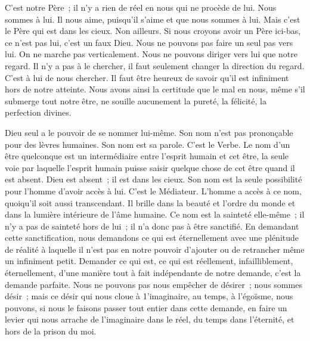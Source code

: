 \documentclass[french,twoside]{book} %
\newenvironment{quoteblock}%
  {\begin{quoting}}
  {\end{quoting}}
\newenvironment{quotebar}{%
    \def\FrameCommand{{\color{rubric!10!}\vrule width 0.5em} \hspace{0.9em}}%
    \def\OuterFrameSep{\itemsep} %
    \MakeFramed {\advance\hsize-\width \FrameRestore}
  }%
  {%
    \endMakeFramed
  }
\renewenvironment{quoteblock}%
  {%
    \savenotes
    \setstretch{0.9}
    \normalfont
    \begin{quotebar}
  }
  {%
    \end{quotebar}
    \spewnotes
  }
\begin{document}
\noindent C'est notre Père ; il n'y a rien de réel en nous qui ne procède de lui. Nous sommes à lui. Il nous aime, puisqu'il s'aime et que nous sommes à lui. Mais c'est le Père qui est dans les cieux. Non ailleurs. Si nous croyons avoir un Père ici-bas, ce n'est pas lui, c'est un faux Dieu. Nous ne pouvons pas faire un seul pas vers lui. On ne marche pas verticalement. Nous ne pouvons diriger vers lui que notre regard. Il n'y a pas à le chercher, il faut seulement changer la direction du regard. C'est à lui de nous chercher. Il faut être heureux de savoir qu'il est infiniment hors de notre atteinte. Nous avons ainsi la certitude que le mal en nous, même s'il submerge tout notre être, ne souille aucunement la pureté, la félicité, la perfection divines.\par

\begin{quoteblock}
 \end{quoteblock}

\noindent Dieu seul a le pouvoir de se nommer lui-même. Son nom n'est pas prononçable pour des lèvres humaines. Son nom est sa parole. C'est le Verbe. Le nom d'un être quelconque est un intermédiaire entre l'esprit humain et cet être, la seule voie par laquelle l'esprit humain puisse saisir quelque chose de cet être quand il est absent. Dieu est absent ; il est dans les cieux. Son nom est la seule possibilité pour l'homme d'avoir accès à lui. C'est le Médiateur. L'homme a accès à ce nom, quoiqu'il soit aussi transcendant. Il brille dans la beauté et l'ordre du monde et dans la lumière intérieure de l'âme humaine. Ce nom est la sainteté elle-même ; il n'y a pas de sainteté hors de lui ; il n'a donc pas à être sanctifié. En demandant cette sanctification, nous demandons ce qui est éternellement avec une plénitude de réalité à laquelle il n'est pas en notre pouvoir d'ajouter ou de retrancher même un infiniment petit. Demander ce qui est, ce qui est réellement, infailliblement, éternellement, d'une manière tout à fait indépendante de notre demande, c'est la demande parfaite. Nous ne pouvons pas nous empêcher de désirer ; nous sommes désir ; mais ce désir qui nous cloue à 1'imaginaire, au temps, à l'égoïsme, nous pouvons, si nous le faisons passer tout entier dans cette demande, en faire un levier qui nous arrache de l'imaginaire dans le réel, du temps dans l'éternité, et hors de la prison du moi.\par

\begin{quoteblock}
 \end{quoteblock}
\end{document}
